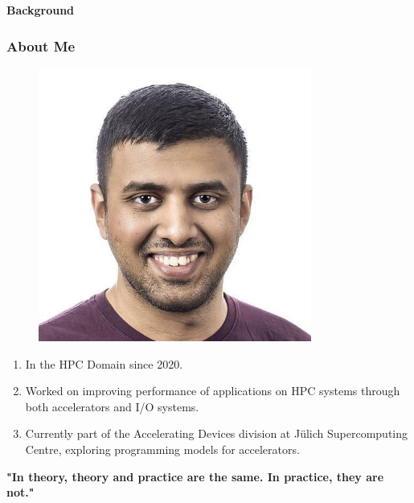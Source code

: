\documentclass[aspectratio=1610,10pt]{penchbeamer}
\begin{document}
\maketitle


\begin{frame}
  \begin{center}
    \begin{huge}
      \textbf{Background}
    \end{huge}
  \end{center}
\end{frame}

\begin{frame}
  \frametitle{About Me}
  \begin{minipage}{0.4\textwidth}
    \begin{figure}
      \begin{center}
        \includegraphics[width=0.8\textwidth]{static/jayesh.png}
      \end{center}
    \end{figure}
  \end{minipage}
  \begin{minipage}{0.45\textwidth}
    \begin{enumerate}
      \item In the HPC Domain since 2020.
      \item Worked on improving performance of applications on HPC systems
        through both accelerators and I/O systems.

      \item Currently part of the Accelerating Devices division at J\"ulich
        Supercomputing Centre, exploring programming models for accelerators.
    \end{enumerate}
    \textbf
    {"In theory, theory and practice are the same. In practice, they are not."}
  \end{minipage}
\end{frame}
\end{document}
